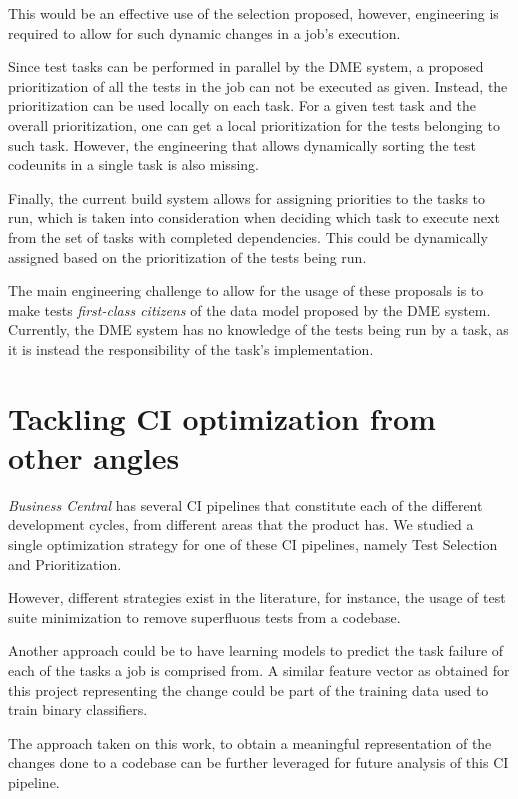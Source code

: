 This would be an effective use of the selection proposed, however, engineering is required
to allow for such dynamic changes in a job's execution. 

Since test tasks can be performed in parallel by the DME system, a 
proposed prioritization of all the tests in the job can not be executed as given. 
Instead, the prioritization can be used locally on each task. For a given
test task and the overall prioritization, one can get a local prioritization for the
tests belonging to such task. However, the engineering that allows dynamically 
sorting the test codeunits in a single task is also missing.

Finally, the current build system allows for assigning priorities to the tasks to run,
which is taken into consideration when deciding which task to execute next from the 
set of tasks with completed dependencies. This could be dynamically assigned based on 
the prioritization of the tests being run. 

The main engineering challenge to allow for the usage of these proposals is to make
tests \emph{first-class citizens} of the data model proposed by the DME system.
Currently, the DME system has no knowledge of the tests being run by a task, as
it is instead the responsibility of the task's implementation.

\section{Tackling CI optimization from other angles}
\emph{Business Central} has several CI pipelines that constitute each of the different
development cycles, from different areas that the product has. We studied a single
optimization strategy for one of these CI pipelines, namely Test Selection and Prioritization.

However, different strategies exist in the literature, for instance, the usage of
test suite minimization to remove superfluous tests from a codebase.

Another approach could be to have learning models to predict the task failure
of each of the tasks a job is comprised from. A similar feature vector as
obtained for this project representing the change could be part of the training 
data used to train binary classifiers.

The approach taken on this work, to obtain a meaningful representation of the
changes done to a codebase can be further leveraged for future analysis of
this CI pipeline.

